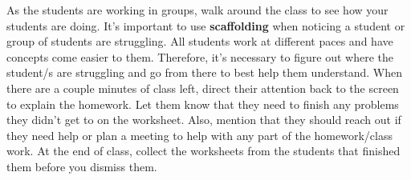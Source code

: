 \begin{outline}
    \1 As the students are working in groups, walk around the class to see how your students are doing. It's important to use \textbf{scaffolding} when noticing a student or group of students are struggling. All students work at different paces and have concepts come easier to them. Therefore, it's necessary to figure out where the student/s are struggling and go from there to best help them understand. 
    \1 When there are a couple minutes of class left, direct their attention back to the screen to explain the homework. Let them know that they need to finish any problems they didn't get to on the worksheet. Also, mention that they should reach out if they need help or plan a meeting to help with any part of the homework/class work. 
    \1 At the end of class, collect the worksheets from the students that finished them before you dismiss them.
\end{outline}